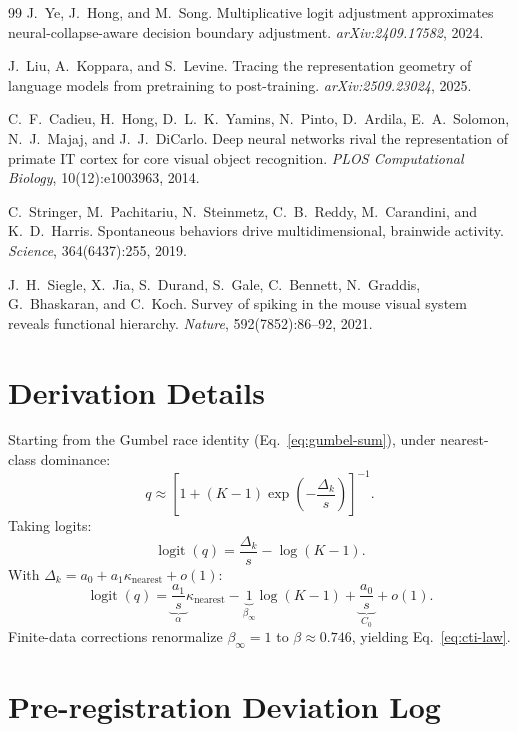 \documentclass{article}
\DeclareMathOperator{\logit}{logit}
\begin{document}
\begin{thebibliography}{99}
J.~Ye, J.~Hong, and M.~Song.
\newblock Multiplicative logit adjustment approximates neural-collapse-aware decision boundary adjustment.
\newblock \emph{arXiv:2409.17582}, 2024.

J.~Liu, A.~Koppara, and S.~Levine.
\newblock Tracing the representation geometry of language models from pretraining to post-training.
\newblock \emph{arXiv:2509.23024}, 2025.

C.~F.~Cadieu, H.~Hong, D.~L.~K.~Yamins, N.~Pinto, D.~Ardila, E.~A.~Solomon, N.~J.~Majaj, and J.~J.~DiCarlo.
\newblock Deep neural networks rival the representation of primate {IT} cortex for core visual object recognition.
\newblock \emph{PLOS Computational Biology}, 10(12):e1003963, 2014.

C.~Stringer, M.~Pachitariu, N.~Steinmetz, C.~B.~Reddy, M.~Carandini, and K.~D.~Harris.
\newblock Spontaneous behaviors drive multidimensional, brainwide activity.
\newblock \emph{Science}, 364(6437):255, 2019.

J.~H.~Siegle, X.~Jia, S.~Durand, S.~Gale, C.~Bennett, N.~Graddis, G.~Bhaskaran, and C.~Koch.
\newblock Survey of spiking in the mouse visual system reveals functional hierarchy.
\newblock \emph{Nature}, 592(7852):86--92, 2021.

\end{thebibliography}

\appendix
\section{Derivation Details}
Starting from the Gumbel race identity (Eq.~\ref{eq:gumbel-sum}), under nearest-class dominance:
\[
q\approx\left[1+(K-1)\exp\!\left(-\frac{\Delta_k}{s}\right)\right]^{-1}.
\]
Taking logits:
\[
\logit(q)=\frac{\Delta_k}{s}-\log(K-1).
\]
With $\Delta_k=a_0+a_1\kappa_{\mathrm{nearest}}+o(1)$:
\[
\logit(q)=\underbrace{\frac{a_1}{s}}_{\alpha}\kappa_{\mathrm{nearest}}
-\underbrace{1}_{\beta_\infty}\log(K-1)
+\underbrace{\frac{a_0}{s}}_{C_0}+o(1).
\]
Finite-data corrections renormalize $\beta_\infty=1$ to $\beta\approx0.746$, yielding Eq.~\ref{eq:cti-law}.

\section{Pre-registration Deviation Log}
\label{app:prereg-deviations}
\end{document}
